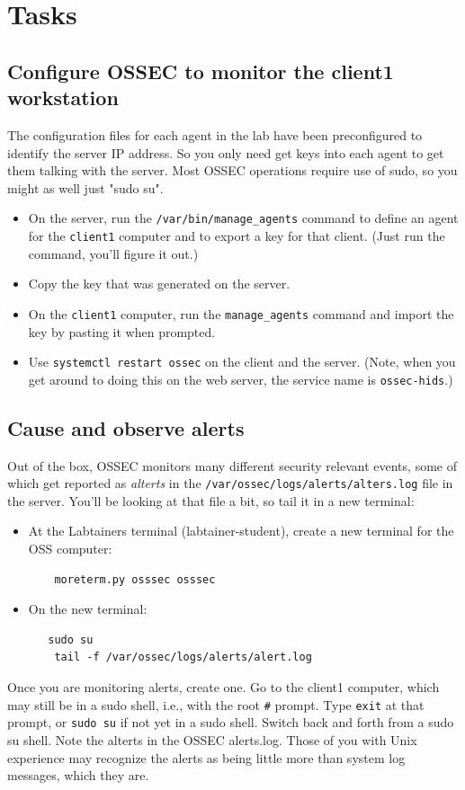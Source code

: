 \section{Tasks}

\subsection{Configure OSSEC to monitor the client1 workstation}
The configuration files for each agent in the lab have been preconfigured to identify the server IP address.  So you only need
get keys into each agent to get them talking with the server.
Most OSSEC operations require use of sudo, so you might as well just "sudo su".
\begin{itemize}
\item On the server, run the {\tt /var/bin/manage\_agents} command to define an agent for the {\tt client1} computer and
to export a key for that client. (Just run the command, you'll figure it out.)
\item Copy the key that was generated on the server.
\item On the {\tt client1} computer, run the {\tt manage\_agents} command and import the key by pasting it when prompted.
\item Use {\tt systemctl restart ossec} on the client and the server.  (Note, when you get around to doing this on the
web server, the service name is {\tt ossec-hids}.)
\end{itemize}

\subsection{Cause and observe alerts}
Out of the box, OSSEC monitors many different security relevant events, some of which get reported as \textit{alterts} in the
{\tt /var/ossec/logs/alerts/alters.log} file in the server.  You'll be looking at that file a bit, so tail it in a new terminal:
\begin{itemize}
\item At the Labtainers terminal (labtainer-student), create a new terminal for the OSS computer:
\begin{verbatim}
    moreterm.py osssec osssec
\end{verbatim}
\item On the new terminal:
\begin{verbatim}
   sudo su
    tail -f /var/ossec/logs/alerts/alert.log
\end{verbatim}
\end{itemize}
Once you are monitoring alerts, create one.  Go to the client1 computer, which may still be in a sudo shell, i.e., with
the root {\tt \#} prompt.  Type {\tt exit} at that prompt, or {\tt sudo su} if not yet in a sudo shell. 
Switch back and forth from a sudo su shell.  Note the alterts in
the OSSEC alerts.log.  Those of you with Unix experience may recognize the alerts as being little more than system log 
messages, which they are.  

